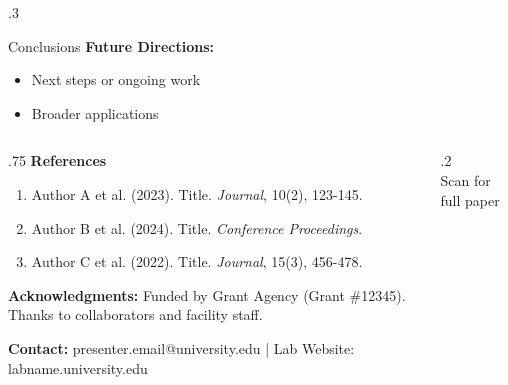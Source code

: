 \documentclass[final,t]{beamer}
\begin{document}
\begin{frame}[t]
\begin{columns}[t]
\begin{column}{.3\linewidth}
\begin{block}{Conclusions}
        \textbf{Future Directions:}
        \begin{itemize}
          \item Next steps or ongoing work
          \item Broader applications
        \end{itemize}
      \end{block}

    \end{column}

  \end{columns}

  \vspace{1cm}


  \begin{block}{}
    \footnotesize
    \begin{columns}[T]
      \begin{column}{.75\linewidth}
        \textbf{References}
        \begin{enumerate}
          \item Author A et al. (2023). Title. \textit{Journal}, 10(2), 123-145.
          \item Author B et al. (2024). Title. \textit{Conference Proceedings}.
          \item Author C et al. (2022). Title. \textit{Journal}, 15(3), 456-478.
        \end{enumerate}

        \vspace{0.3cm}

        \textbf{Acknowledgments:} Funded by Grant Agency (Grant \#12345). Thanks to collaborators and facility staff.

        \vspace{0.3cm}

        \textbf{Contact:} presenter.email@university.edu | Lab Website: labname.university.edu
      \end{column}

      \begin{column}{.2\linewidth}
        \centering
        \\
        \tiny Scan for full paper
      \end{column}
    \end{columns}
  \end{block}

\end{frame}
\end{document}
